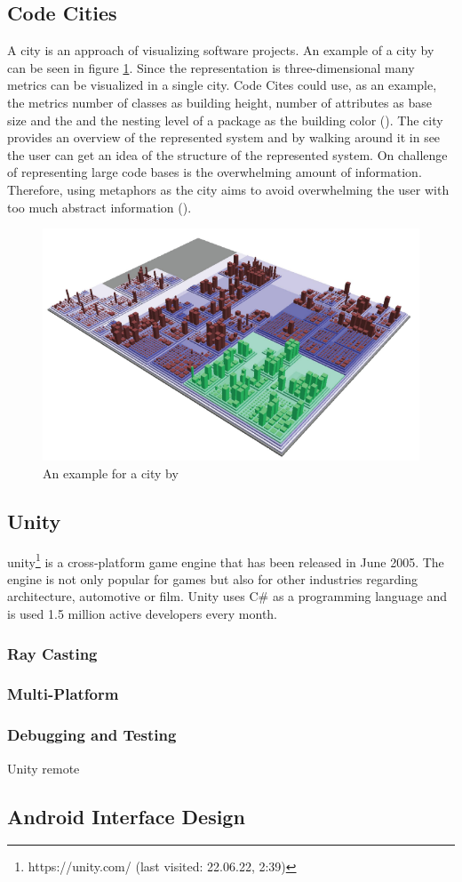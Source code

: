\subsection{Code Cities}
A \gls{city} is an approach of visualizing software projects.
An example of a \gls{city} by \cite{wettel2007visualizing} can be seen in figure \ref{fig:city_example}.
Since the representation is three-dimensional many metrics can be visualized in a single \gls{city}.
Code Cites could use, as an example, the metrics number of classes as building height, number of attributes as base size and the and the nesting level of a package as the building color (\cite{wettel2008visual}).
The \gls{city} provides an overview of the represented system and by walking around it in \gls{see} the user can get an idea of the structure of the represented system.
On challenge of representing large code bases is the overwhelming amount of information.
Therefore, using metaphors as the \gls{city} aims to avoid overwhelming the user with too much abstract information (\cite{Wettel2008}).
\begin{figure}[htb]
    \centering
    \includegraphics[width=1\textwidth]{Fundamentals/img/code_city.png}
    \caption{An example for a \gls{city} by \cite{wettel2007visualizing}}
    \label{fig:city_example}
\end{figure}

\subsection{Unity}
\gls{unity}\footnote{https://unity.com/ (last visited: 22.06.22, 2:39)} is a cross-platform game engine that has been released in June 2005.
The engine is not only popular for games but also for other industries regarding architecture, automotive or film.
Unity uses C\# as a programming language and is used 1.5 million active developers every month. 
\subsubsection{Ray Casting}
\label{sec:ray}
\subsubsection{Multi-Platform}
\subsubsection{Debugging and Testing}
Unity remote
\subsection{Android Interface Design}
